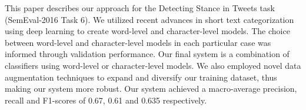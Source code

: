 This paper describes our approach for the Detecting Stance in Tweets task (SemEval-2016 Task 6). We utilized recent advances in short text categorization using deep learning to create word-level and character-level models. The choice between word-level and character-level models in each particular case was informed through validation performance. Our final system is a combination of classifiers using word-level or character-level models. We also employed novel data augmentation techniques to expand and diversify our training dataset, thus making our system more robust. Our system achieved a macro-average precision, recall and F1-scores of 0.67, 0.61 and 0.635 respectively.
